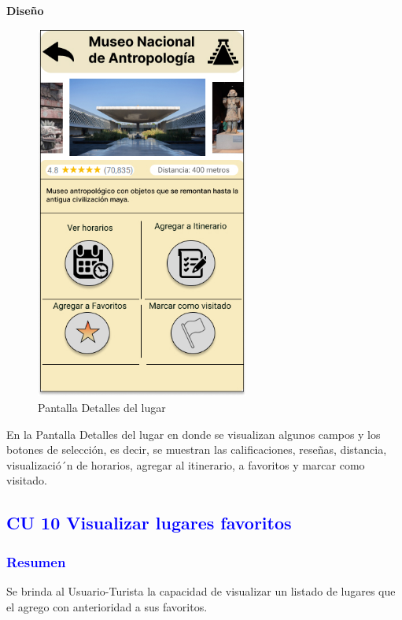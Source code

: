 \textbf{Diseño}
\begin{figure}[h]
        \centering
        \includegraphics[width= 7cm]{Pantallas Prototipo3/IU41-Detalles del lugar.jpg}
        \caption{Pantalla Detalles del lugar}
        \label{fig:enter-label}
    \end{figure}
 

En la Pantalla Detalles del lugar en donde se visualizan algunos campos y los botones de selección, es decir, se muestran las calificaciones, reseñas, distancia, visualizació´n de horarios, agregar al itinerario, a favoritos y marcar como visitado.
\newpage


\pagebreak
\subsection{\textcolor{blue}{CU 10 Visualizar lugares favoritos}}

\subsubsection{\textcolor{blue}{Resumen}}{
Se brinda al Usuario-Turista la capacidad de visualizar un listado de lugares
que el agrego con anterioridad a sus favoritos.
}

